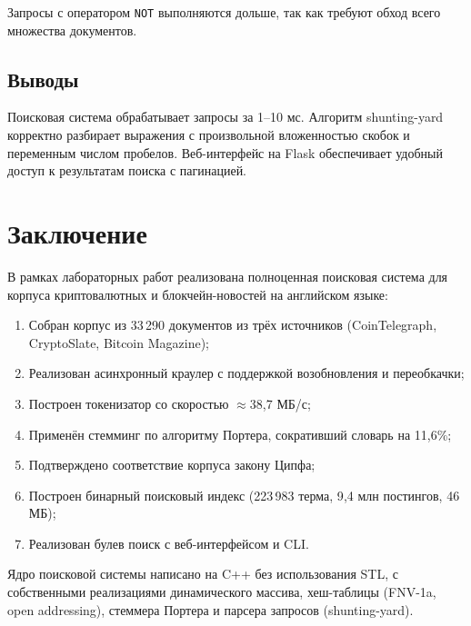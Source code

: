 \documentclass[12pt,a4paper]{article}
\begin{document}
Запросы с оператором \texttt{NOT} выполняются дольше, так как требуют
обход всего множества документов.

\subsection{Выводы}
Поисковая система обрабатывает запросы за 1--10 мс. Алгоритм shunting-yard
корректно разбирает выражения с произвольной вложенностью скобок и
переменным числом пробелов. Веб-интерфейс на Flask обеспечивает удобный
доступ к результатам поиска с пагинацией.

\section*{Заключение}

В рамках лабораторных работ реализована полноценная поисковая система
для корпуса криптовалютных и блокчейн-новостей на английском языке:

\begin{enumerate}
    \item Собран корпус из 33\,290 документов из трёх источников (CoinTelegraph, CryptoSlate, Bitcoin Magazine);
    \item Реализован асинхронный краулер с поддержкой возобновления и переобкачки;
    \item Построен токенизатор со скоростью $\approx$38{,}7 МБ/с;
    \item Применён стемминг по алгоритму Портера, сокративший словарь на 11{,}6\%;
    \item Подтверждено соответствие корпуса закону Ципфа;
    \item Построен бинарный поисковый индекс (223\,983 терма, 9{,}4 млн постингов, 46 МБ);
    \item Реализован булев поиск с веб-интерфейсом и CLI.
\end{enumerate}

Ядро поисковой системы написано на C++ без использования STL, с собственными
реализациями динамического массива, хеш-таблицы (FNV-1a, open addressing),
стеммера Портера и парсера запросов (shunting-yard).
\end{document}

